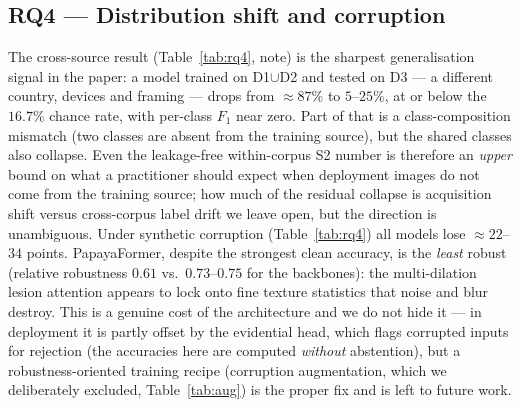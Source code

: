 \documentclass[10pt,twocolumn,a4paper]{article}
\begin{document}
\subsection{RQ4 --- Distribution shift and corruption}
The cross-source result (Table~\ref{tab:rq4}, note) is the sharpest generalisation signal in the paper: a model trained on D1$\cup$D2 and tested on D3 --- a different country, devices and framing --- drops from $\approx87\%$ to $5$--$25\%$, at or below the $16.7\%$ chance rate, with per-class $F_1$ near zero. Part of that is a class-composition mismatch (two classes are absent from the training source), but the shared classes also collapse. Even the leakage-free within-corpus S2 number is therefore an \emph{upper} bound on what a practitioner should expect when deployment images do not come from the training source; how much of the residual collapse is acquisition shift versus cross-corpus label drift we leave open, but the direction is unambiguous. Under synthetic corruption (Table~\ref{tab:rq4}) all models lose $\approx22$--$34$ points. PapayaFormer, despite the strongest clean accuracy, is the \emph{least} robust (relative robustness $0.61$ vs.\ $0.73$--$0.75$ for the backbones): the multi-dilation lesion attention appears to lock onto fine texture statistics that noise and blur destroy. This is a genuine cost of the architecture and we do not hide it --- in deployment it is partly offset by the evidential head, which flags corrupted inputs for rejection (the accuracies here are computed \emph{without} abstention), but a robustness-oriented training recipe (corruption augmentation, which we deliberately excluded, Table~\ref{tab:aug}) is the proper fix and is left to future work.
\end{document}

